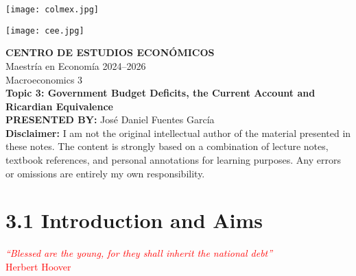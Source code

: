 \documentclass[12pt]{article}
\title{}
\author{}
\date{}
\begin{document}
\begin{titlepage}
    \vspace*{-1cm}
    \noindent
    \begin{minipage}[t]{0.49\textwidth}
        \texttt{[image: colmex.jpg]}
    \end{minipage}%
    \begin{minipage}[t]{0.49\textwidth}
        \raggedleft
        \texttt{[image: cee.jpg]}
    \end{minipage}

    \vspace*{2cm}

    \begin{center}
        \Huge \textbf{CENTRO DE ESTUDIOS ECONÓMICOS} \\[1.5em]
        \Large Maestría en Economía 2024--2026 \\[2em]
        \Large Macroeconomics 3 \\[3em]
        \LARGE \textbf{Topic 3: Government Budget Deficits, the Current
Account and Ricardian Equivalence} \\[3em]
        \large \textbf{PRESENTED BY:} José Daniel Fuentes García \\[3em]
        \large \textbf{Disclaimer:} I am not the original intellectual author of the material presented in these notes. The content is strongly based on a combination of lecture notes, textbook references, and personal annotations for learning purposes. Any errors or omissions are entirely my own responsibility.\\[0.9em]
        
    \end{center}

    \vfill
\end{titlepage}

\newpage

\setcounter{secnumdepth}{2}
\setcounter{tocdepth}{3}
\tableofcontents

\newpage

\section*{\noindent\textbf{3.1 Introduction and Aims}}

\begin{center}
\textcolor{red}{\textit{``Blessed are the young, for they shall inherit the national debt''}}\\
\textcolor{red}{Herbert Hoover}
\end{center}
\end{document}
